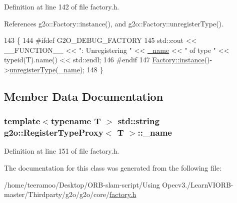 Definition at line 142 of file factory.\+h.



References g2o\+::\+Factory\+::instance(), and g2o\+::\+Factory\+::unregister\+Type().


\begin{DoxyCode}
143       \{
144 \textcolor{preprocessor}{#ifdef G2O\_DEBUG\_FACTORY}
145         std::cout << \_\_FUNCTION\_\_ << \textcolor{stringliteral}{": Unregistering "} << \hyperlink{classg2o_1_1RegisterTypeProxy_a34c9e807a21fc0dbafd8980c17bf77f9}{\_name} << \textcolor{stringliteral}{" of type "} << \textcolor{keyword}{typeid}(T).name() <<
       std::endl;
146 \textcolor{preprocessor}{#endif}
147         \hyperlink{classg2o_1_1Factory_a8a1f33e017c5ad59399cef48972578ae}{Factory::instance}()->\hyperlink{classg2o_1_1Factory_a01b16c7d5a49ddab5ccd5980f76900b7}{unregisterType}(\hyperlink{classg2o_1_1RegisterTypeProxy_a34c9e807a21fc0dbafd8980c17bf77f9}{\_name});
148       \}
\end{DoxyCode}


\subsection{Member Data Documentation}
\subsubsection[{\texorpdfstring{\+\_\+name}{_name}}]{\setlength{\rightskip}{0pt plus 5cm}template$<$typename T $>$ std\+::string {\bf g2o\+::\+Register\+Type\+Proxy}$<$ T $>$\+::\+\_\+name\hspace{0.3cm}{\ttfamily [private]}}\hypertarget{classg2o_1_1RegisterTypeProxy_a34c9e807a21fc0dbafd8980c17bf77f9}{}\label{classg2o_1_1RegisterTypeProxy_a34c9e807a21fc0dbafd8980c17bf77f9}


Definition at line 151 of file factory.\+h.



The documentation for this class was generated from the following file\+:\begin{DoxyCompactItemize}
\item 
/home/teeramoo/\+Desktop/\+O\+R\+B-\/slam-\/script/\+Using Opecv3./\+Learn\+V\+I\+O\+R\+B-\/master/\+Thirdparty/g2o/g2o/core/\hyperlink{factory_8h}{factory.\+h}\end{DoxyCompactItemize}
